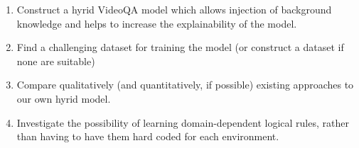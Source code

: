 \documentclass[../interim.tex]{subfiles}
\begin{document}
\begin{enumerate}
  \item Construct a hyrid VideoQA model which allows injection of background knowledge and helps to increase the explainability of the model.

  \item Find a challenging dataset for training the model (or construct a dataset if none are suitable)

  \item Compare qualitatively (and quantitatively, if possible) existing approaches to our own hyrid model.

  \item Investigate the possibility of learning domain-dependent logical rules, rather than having to have them hard coded for each environment.
\end{enumerate}
\end{document}
